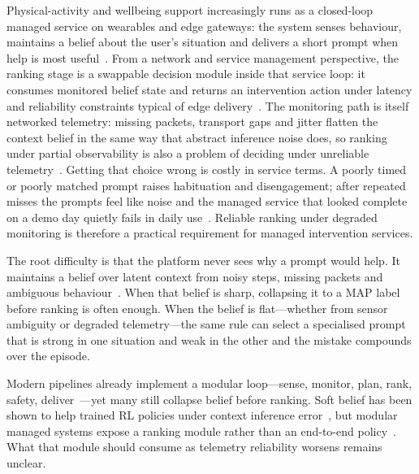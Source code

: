 \documentclass[journal]{IEEEtran}
\begin{document}
Physical-activity and wellbeing support increasingly runs as a closed-loop managed service on wearables and edge gateways: the system senses behaviour, maintains a belief about the user's situation and delivers a short prompt when help is most useful~\cite{nahum2018jitai,liao2020heartsteps}.
From a network and service management perspective, the ranking stage is a swappable decision module inside that service loop: it consumes monitored belief state and returns an intervention action under latency and reliability constraints typical of edge delivery~\cite{shi2016edge,borsatti2024kubetwin}.
The monitoring path is itself networked telemetry: missing packets, transport gaps and jitter flatten the context belief in the same way that abstract inference noise does, so ranking under partial observability is also a problem of deciding under unreliable telemetry~\cite{wang2023dtservice}.
Getting that choice wrong is costly in service terms.
A poorly timed or poorly matched prompt raises habituation and disengagement; after repeated misses the prompts feel like noise and the managed service that looked complete on a demo day quietly fails in daily use~\cite{nahum2018jitai,karine2024stepcount}.
Reliable ranking under degraded monitoring is therefore a practical requirement for managed intervention services.

The root difficulty is that the platform never sees why a prompt would help.
It maintains a belief over latent context from noisy steps, missing packets and ambiguous behaviour~\cite{kaelbling1998pomdp}.
When that belief is sharp, collapsing it to a MAP label before ranking is often enough.
When the belief is flat---whether from sensor ambiguity or degraded telemetry---the same rule can select a specialised prompt that is strong in one situation and weak in the other and the mistake compounds over the episode.

Modern pipelines already implement a modular loop---sense, monitor, plan, rank, safety, deliver~\cite{yao2023react,shi2016edge,wang2023dtservice}---yet many still collapse belief before ranking.
Soft belief has been shown to help trained RL policies under context inference error~\cite{karine2023uai}, but modular managed systems expose a ranking module rather than an end-to-end policy~\cite{sutton2018rl}.
What that module should consume as telemetry reliability worsens remains unclear.
\end{document}

